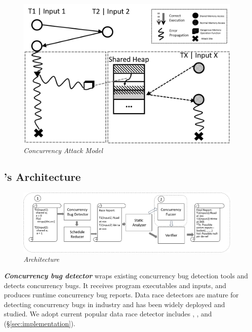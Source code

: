 \begin{figure}
	\centering
	\includegraphics[width=1\columnwidth]{figures/model}
	\vspace{-.25in}
	\caption{{\em Concurrency Attack Model}} 
	\label{fig:model}
	\vspace{-0.1in}
\end{figure}




\subsection{\xxx's Architecture}\label{sec:archi}
\begin{figure}
	\centering
	\includegraphics[width=1.8\columnwidth]{figures/archi}
	\vspace{0in}
	\caption{{\em Architecture}} 
	\label{fig:archi}
	\vspace{-0.1in}
\end{figure}



\emph{\textbf{Concurrency bug detector}} wraps existing concurrency bug detection tools and detects concurrency bugs.  
It receives program executables and inputs, and produces runtime concurrency bug reports. 
Data race detectors are mature for detecting concurrency bugs in industry and has been widely deployed and studied. 
We adopt current popular data race detector includes \tsan, \valgrind, \ski and \ktsan(\S\ref{sec:implementation}).


